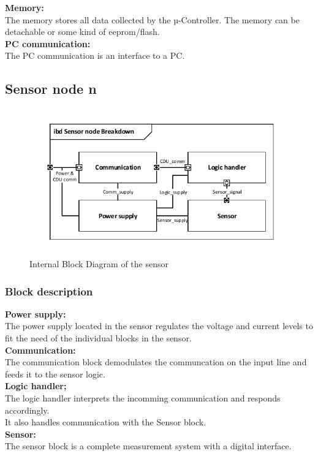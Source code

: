 \textbf{Memory:}\\
The memory stores all data collected by the µ-Controller. The memory can be detachable or some kind of eeprom/flash.\\

\textbf{PC communication:}\\
The PC communication is an interface to a PC.\\


\subsection{Sensor node n}

\begin{figure}[hbpt]
\centering
\includegraphics[width=.8\textwidth]{billeder/Sensor_IBD}
\caption{Internal Block Diagram of the sensor}
\label{Sensor_IBD}
\end{figure}

\subsubsection{Block description}

\textbf{Power supply:}\\
The power supply located in the sensor regulates the voltage and current levels to fit the need of the individual blocks in the sensor.\\

\textbf{Communication:}\\
The communication block demodulates the communcation on the input line and feeds it to the sensor logic.\\

\textbf{Logic handler;}\\
The logic handler interprets the incomming communication and responds accordingly.\\
It also handles communication with the Sensor block.\\

\textbf{Sensor:}\\
The sensor block is a complete measurement system with a digital interface.\\



